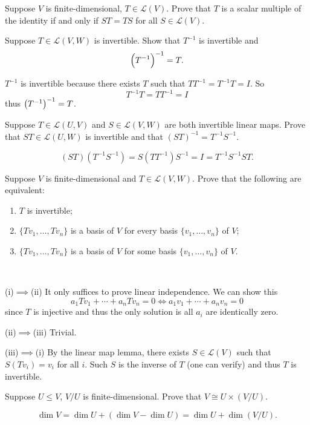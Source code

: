 \begin{prbm}
Suppose $V$ is finite-dimensional, $T\in\mathcal{L}(V)$. Prove that $T$ is a scalar multiple of the identity if and only if $ST=TS$ for all $S\in\mathcal{L}(V)$.
\end{prbm}

\begin{prbm}
Suppose $T\in\mathcal{L}(V,W)$ is invertible. Show that $T^{-1}$ is invertible and
\[\left(T^{-1}\right)^{-1}=T.\]
\end{prbm}

\begin{solution}
$T^{-1}$ is invertible because there exists $T$ such that $TT^{-1}=T^{-1}T=I$. So
\[T^{-1}T=TT^{-1}=I\]
thus $\left(T^{-1}\right)^{-1}=T$.
\end{solution}

\begin{prbm}
Suppose $T\in\mathcal{L}(U,V)$ and $S\in\mathcal{L}(V,W)$ are both invertible linear maps. Prove that $ST\in\mathcal{L}(U,W)$ is invertible and that $(ST)^{-1}=T^{-1}S^{-1}$.
\end{prbm}

\begin{solution}
\[(ST)(T^{-1}S^{-1})=S(TT^{-1})S^{-1}=I=T^{-1}S^{-1}ST.\]
\end{solution}

\begin{prbm}
Suppose $V$ is finite-dimensional and $T\in\mathcal{L}(V,W)$. Prove that the following are equivalent:
\begin{enumerate}[label=(\roman*)]
\item $T$ is invertible;
\item $\{Tv_1,\dots,Tv_n\}$ is a basis of $V$ for every basis $\{v_1,\dots,v_n\}$ of $V$;
\item $\{Tv_1,\dots,Tv_n\}$ is a basis of $V$ for some basis $\{v_1,\dots,v_n\}$ of $V$.
\end{enumerate}
\end{prbm}

\begin{solution} \

(i)$\implies$(ii) It only suffices to prove linear independence. We can show this
\[a_1Tv_1+\cdots+a_nTv_n=0\iff a_1v_1+\cdots+a_nv_n=0\]
since $T$ is injective and thus the only solution is all $a_i$ are identically zero.

(ii)$\implies$(iii) Trivial.

(iii)$\implies$(i) By the linear map lemma, there exists $S\in\mathcal{L}(V)$ such that $S(Tv_i)=v_i$ for all $i$. Such $S$ is the inverse of $T$ (one can verify) and thus $T$ is invertible.
\end{solution}

\begin{prbm}
Suppose $U\le V$, $V/U$ is finite-dimensional. Prove that $V\cong U\times(V/U)$.
\end{prbm}

\begin{solution}
\[\dim V=\dim U+(\dim V-\dim U)=\dim U+\dim(V/U).\]
\end{solution}